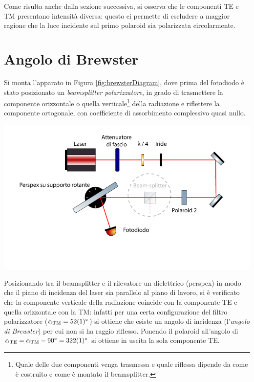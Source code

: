 \documentclass[10pt,oneside,a4paper]{article}
\newenvironment{Figure}
  {\par\medskip\noindent\minipage{\linewidth}}
  {\endminipage\par\medskip}
\begin{document}
\begin{multicols}{2}
Come risulta anche dalla sezione successiva, si osserva che le componenti TE e TM presentano intensità diversa: questo ci permette di escludere a maggior ragione che la luce incidente sul primo polaroid sia polarizzata circolarmente.



\section{Angolo di Brewster}
Si monta l'apparato in Figura \ref{fig:brewsterDiagram}, dove prima del fotodiodo è stato posizionato un \emph{beamsplitter polarizzatore}, in grado di trasmettere la componente orizzontale o quella verticale\footnote{Quale delle due componenti venga trasmessa e quale riflessa dipende da come è costruito e come è montato il beamsplitter.} della radiazione e riflettere la componente ortogonale, con coefficiente di assorbimento complessivo quasi nullo. 

\begin{Figure}
	\begin{center}
	\includegraphics[width=\linewidth]{brewsterDiagram.png}
	\label{fig:brewsterDiagram}
	\end{center}
\end{Figure}

Posizionando tra il beamsplitter e il rilevatore un dielettrico (perspex) in modo che il piano di incidenza del laser sia parallelo al piano di lavoro, si è verificato che la componente verticale della radiazione coincide con la componente TE e quella orizzontale con la TM: infatti per una certa configurazione del filtro polarizzatore ($\alpha_\text{TM} = \SI{52 \pm 1}{\degree}$) si ottiene che esiste un angolo di incidenza (l'\emph{angolo di Brewster}) per cui non si ha raggio riflesso. Ponendo il polaroid  all'angolo di $\alpha_\text{TE} = \alpha_\text{TM} - \SI{90}{\degree} = \SI{322 \pm 1}{\degree}$ si ottiene in uscita la sola componente TE.


\end{multicols}
\end{document}
